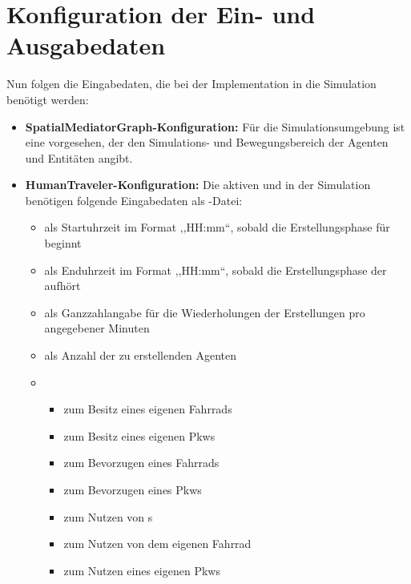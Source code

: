 %


\section{Konfiguration der Ein- und Ausgabedaten}\label{sec:input-output-configuration}

Nun folgen die Eingabedaten, die bei der Implementation in die Simulation benötigt werden:

\begin{itemize}
    \item \textbf{SpatialMediatorGraph-Konfiguration:} Für die Simulationsumgebung ist eine  vorgesehen, der den Simulations- und Bewegungsbereich der Agenten und Entitäten angibt.
    \item \textbf{HumanTraveler-Konfiguration:} Die aktiven  und  in der Simulation benötigen folgende Eingabedaten als -Datei:
    \begin{itemize}
        \item {} als Startuhrzeit im Format ,,HH:mm``, sobald die Erstellungsphase für  beginnt
        \item {} als Enduhrzeit im Format ,,HH:mm``, sobald die Erstellungsphase der  aufhört
        \item {} als Ganzzahlangabe für die Wiederholungen der Erstellungen pro angegebener Minuten
        \item {} als Anzahl der zu erstellenden Agenten
        \item {}
        \begin{itemize}
            \item {} zum Besitz eines eigenen Fahrrads
            \item {} zum Besitz eines eigenen Pkws
            \item {} zum Bevorzugen eines Fahrrads
            \item {} zum Bevorzugen eines Pkws
            \item {} zum Nutzen von s
            \item {} zum Nutzen von dem eigenen Fahrrad
            \item {} zum Nutzen eines eigenen Pkws

\end{itemize}
\end{itemize}
\end{itemize}
